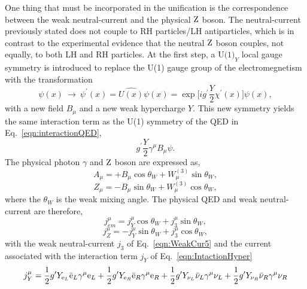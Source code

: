 One thing that must be incorporated in the unification is the correspondence between the weak neutral-current and the physical $\mathrm{Z}$ boson. The neutral-current previously stated does not couple to RH particles/LH antiparticles, which is in contrast to the experimental evidence that the neutral $\mathrm{Z}$ boson couples, not equally, to both LH and RH particles. 
At the first step, a $\text{U(1)}_{Y}$ local gauge symmetry is introduced to replace the U(1) gauge group of the electromegnetism with the transformation
\begin{equation}
\psi(x) \ \to\ \psi^{\prime}(x) = \hat{U(x)}\psi(x) = \exp\bigg[ig^{\prime}\frac{Y}{2}\chi^{\prime}(x)\bigg]\psi(x),
\end{equation}
with a new field $B_{\mu}$ and a new weak hypercharge $Y$.
This new symmetry yields the same interaction term as the U(1) symmetry of the QED in Eq.~\ref{eqn:interactionQED}, 
\begin{equation}
\label{eqn:IntactionHyper}
g^{\prime}\frac{Y}{2}\gamma^{\mu}B_{\mu}\psi.
\end{equation}
The physical photon $\gamma$ and $\mathrm{Z}$ boson are expressed as,
\begin{equation}
\label{eqn:Afield}
A_{\mu}=+B_{\mu}\cos\theta_{W} + W_{\mu}^{(3)}\sin\theta_{W},
\end{equation}
\begin{equation}
\label{eqn:Zfield}
Z_{\mu}=-B_{\mu}\sin\theta_{W} + W_{\mu}^{(3)}\cos\theta_{W},
\end{equation}
where the $\theta_{W}$ is the weak mixing angle. The physical QED and weak neutral- current are therefore,
\begin{equation}
\label{eqn:jem1}
j_{em}^{\mu}=j_{Y}^{\mu}\cos\theta_{W} + j_{3}^{\mu}\sin\theta_{W},
\end{equation}
\begin{equation}
\label{eqn:jz1}
j_{Z}^{\mu}=-j_{Y}^{\mu}\sin\theta_{W} + j_{3}^{\mu}\cos\theta_{W},
\end{equation}
with the weak neutral-current $j_{3}$ of Eq.~\ref{eqn:WeakCur5} and the current associated with the interaction term $j_{Y}$ of Eq.~\ref{eqn:IntactionHyper} 
\begin{equation}
j_{Y}^{\mu}=\frac{1}{2}g^{\prime}Y_{\mathrm{e}_{L}}\bar{\mathrm{e}}_{L}\gamma^{\mu}\mathrm{e}_{L}
+\frac{1}{2}g^{\prime}Y_{\mathrm{e}_{R}}\bar{\mathrm{e}}_{R}\gamma^{\mu}\mathrm{e}_{R}
+\frac{1}{2}g^{\prime}Y_{\nu_{L}}\bar{\nu}_{L}\gamma^{\mu}\nu_{L}
+\frac{1}{2}g^{\prime}Y_{\nu_{R}}\bar{\nu}_{R}\gamma^{\mu}\nu_{R}
\end{equation}
